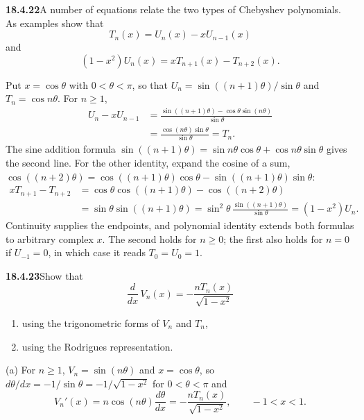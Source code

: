 \par\bigskip
\noindent\textbf{18.4.22}\quad A number of equations relate the two
types of Chebyshev polynomials. As examples show that
\[
T_{n}(x)=U_{n}(x)-xU_{n-1}(x)
\]
and
\[
(1-x^{2})U_{n}(x)=xT_{n+1}(x)-T_{n+2}(x).
\]
\par\nobreak
\solution
Put $x=\cos\theta$ with $0<\theta<\pi$, so that
$U_n=\sin((n+1)\theta)/\sin\theta$ and $T_n=\cos n\theta$.  For $n\ge1$,
\begin{align*}
U_n-xU_{n-1}
 &=\frac{\sin((n+1)\theta)-\cos\theta\sin(n\theta)}{\sin\theta}\\
 &=\frac{\cos(n\theta)\sin\theta}{\sin\theta}
 =\boxed{T_n}.
\end{align*}
The sine addition formula
$\sin((n+1)\theta)=\sin n\theta\cos\theta+\cos n\theta\sin\theta$
gives the second line.
For the other identity, expand the cosine of a sum,
$\cos((n+2)\theta)=\cos((n+1)\theta)\cos\theta-\sin((n+1)\theta)\sin\theta$:
\begin{align*}
xT_{n+1}-T_{n+2}
 &=\cos\theta\cos((n+1)\theta)-\cos((n+2)\theta)\\
 &=\sin\theta\sin((n+1)\theta)
  =\sin^2\theta\,\frac{\sin((n+1)\theta)}{\sin\theta}
 =\boxed{(1-x^2)U_n}.
\end{align*}
Continuity supplies the endpoints, and polynomial identity extends
both formulas to arbitrary complex $x$.  The second holds for
$n\ge0$; the first also holds for $n=0$ if $U_{-1}=0$, in
which case it reads $T_0=U_0=1$.

\par\bigskip
\noindent\textbf{18.4.23}\quad Show that
\[
\frac{d}{dx}\,V_{n}(x)=-\frac{nT_{n}(x)}{\sqrt{1-x^{2}}}
\]
\begin{enumerate}
\item[(a)] using the trigonometric forms of $V_{n}$ and $T_{n}$,
\item[(b)] using the Rodrigues representation.
\end{enumerate}
\par\nobreak
\solution
(a) For $n\ge1$, $V_n=\sin(n\theta)$ and $x=\cos\theta$, so
$d\theta/dx=-1/\sin\theta=-1/\sqrt{1-x^2}$ for $0<\theta<\pi$ and
\[
V_n'(x)=n\cos(n\theta)\frac{d\theta}{dx}
 =\boxed{-\frac{nT_n(x)}{\sqrt{1-x^2}}},\qquad -1<x<1.
\]


